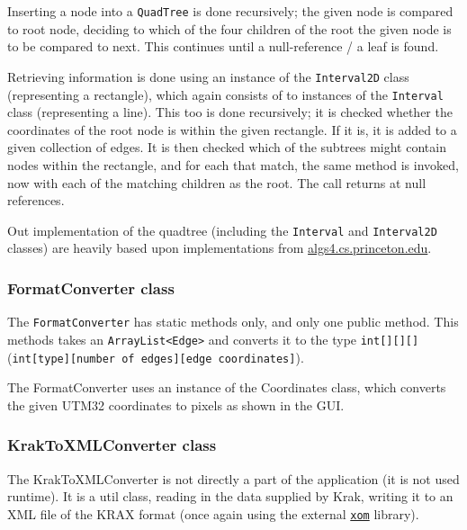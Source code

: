 \documentclass[a4paper,11pt]{article}
\begin{document}
Inserting a node into a \texttt{QuadTree} is done recursively; the given node is compared to root node, deciding to which of the four children of the root the given node is to be compared to next. This continues until a null-reference / a leaf is found.

Retrieving information is done using an instance of the \texttt{Interval2D} class (representing a rectangle), which again consists of to instances of the \texttt{Interval} class (representing a line). This too is done recursively; it is checked whether the coordinates of the root node is within the given rectangle. If it is, it is added to a given collection of edges. It is then checked which of the subtrees might contain nodes within the rectangle, and for each that match, the same method is invoked, now with each of the matching children as the root. The call returns at null references.

Out implementation of the quadtree (including the \texttt{Interval} and \texttt{Interval2D} classes) are heavily based upon implementations from
\url{algs4.cs.princeton.edu}.


\subsubsection{FormatConverter class} %
The \texttt{FormatConverter} has static methods only, and only one public method. This methods takes an \texttt{ArrayList<Edge>} and converts it to the type \texttt{int[][][]} (\texttt{int[type][number of edges][edge coordinates]}).

The FormatConverter uses an instance of the Coordinates class, which converts the given UTM32 coordinates to pixels as shown in the GUI.

\subsubsection{KrakToXMLConverter class} %
The KrakToXMLConverter is not directly a part of the application (it is not used runtime). It is a util class, reading in the data supplied by Krak, writing it to an XML file of the KRAX format (once again using the external \href{www.xom.nu}{\texttt{xom}} library).
\end{document}
